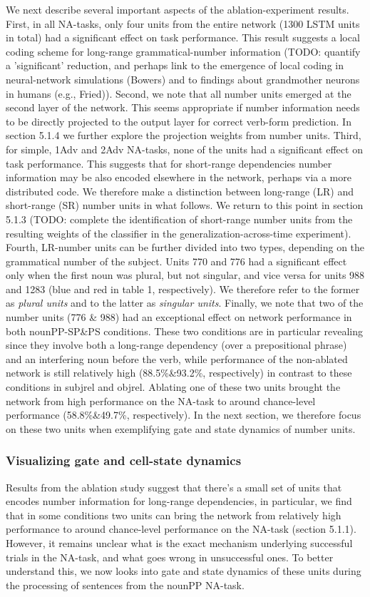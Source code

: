 We next describe several important aspects of the ablation-experiment results. First, in all NA-tasks, only four units from the entire network (1300 LSTM units in total) had a significant effect on task performance. This result suggests a local coding scheme for long-range grammatical-number information (TODO: quantify a 'significant' reduction, and perhaps link to the emergence of local coding in neural-network simulations (Bowers) and to findings about grandmother neurons in humans (e.g., Fried)). Second, we note that all number units emerged at the second layer of the network. This seems appropriate if number information needs to be directly projected to the output layer for correct verb-form prediction. In section 5.1.4 we further explore the projection weights from number units. Third, for simple, 1Adv and 2Adv NA-tasks, none of the units had a significant effect on task performance. This suggests that for short-range dependencies number information may be also encoded elsewhere in the network, perhaps via a more distributed code. We therefore make a distinction between long-range (LR) and short-range (SR) number units in what follows. We return to this point in section 5.1.3 (TODO: complete the identification of short-range number units from the resulting weights of the classifier in the generalization-across-time experiment). Fourth, LR-number units can be further divided into two types, depending on the grammatical number of the subject. Units 770 and 776 had a significant effect only when the first noun was plural, but not singular, and vice versa for units 988 and 1283 (blue and red in table 1, respectively). We therefore refer to the former as \textit{plural units} and to the latter as \textit{singular units}. Finally, we note that two of the number units (776 \& 988) had an exceptional effect on network performance in both nounPP-SP\&PS conditions. These two conditions are in particular revealing since they involve both a long-range dependency (over a prepositional phrase) and an interfering noun before the verb, while performance of the non-ablated network is still relatively high (88.5\%\&93.2\%, respectively) in contrast to these conditions in subjrel and objrel. Ablating one of these two units brought the network from high performance on the NA-task to around chance-level performance (58.8\%\&49.7\%, respectively). In the next section, we therefore focus on these two units when exemplifying gate and state dynamics of number units. 

\subsubsection{Visualizing gate and cell-state dynamics}
Results from the ablation study suggest that there's a small set of units that encodes number information for long-range dependencies, in particular, we find that in some conditions two units can bring the network from relatively high performance to around chance-level performance on the NA-task (section 5.1.1). However, it remains unclear what is the exact mechanism underlying successful trials in the NA-task, and what goes wrong in unsuccessful ones. To better understand this, we now looks into gate and state dynamics of these units during the processing of sentences from the nounPP NA-task. 

